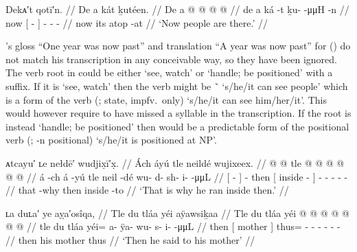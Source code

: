 \ex\label{ex:92-174-people-there}%
%
\begingl
	\glpreamble	Dekᴀ′t qotī′n. //
	\glpreamble	De a kát ḵutéen. //
	\gla	De {} a  @ {} {}  @ {} @ {} @ {} //
	\glb	de {} a ká -t {} ḵu-  -μμH -n //
	\glc	now {}[   - {}]
		-  - - //
	\gld	now {} its atop -at {}  {} {} {} //
	\glft	‘Now people are there.’
		//
\endgl
\xe

\citeauthor{swanton:1909}’s gloss “One year was now past” and translation “A year was now past” for (\lastx) do not match his transcription in any conceivable way, so they have been ignored.
The verb root in  could be either  ‘see, watch’ or  ‘handle; be positioned’ with a  suffix.
If it is  ‘see, watch’ then the verb might be  \~\  ‘s/he/it can see people’ which is a form of the verb  (;  state, impfv.\ only) ‘s/he/it can see him/her/it’.
This would however require \citeauthor{swanton:1909} to have missed a syllable in the transcription.
If the root is instead  ‘handle; be positioned’ then  would be a predictable form of the positional verb  (; -n positional) ‘s/he/it is positioned at NP’.

\ex\label{ex:92-175-thats-why-ran-inside}%
%
\begingl
	\glpreamble	ᴀtcayu′ ʟe nełdē′ wudjix̣ī′x̣. //
	\glpreamble	Ách áyú tle neildé wujixeex. //
	\gla	{}  @ {} {}  @ {}
		tle {}  @ {} {}  @ {} @ {} @ {} @ {} @ {} //
	\glb	{} á -ch {} á -yú
		tle {} neil -dé {} wu- d- sh- i-  -μμL //
	\glc	{}[  - {}]  -
		then {}[ inside - {}]
		- - - -  - //
	\gld	{} that -why {}  {}
		then {} inside -to {}  //
	\glft	‘That is why he ran inside then.’
		//
\endgl
\xe

\ex\label{ex:92-176-then-said-to-mother}%
%
\begingl
	\glpreamble	ʟa duʟa′ ye aỵa′osîqa, //
	\glpreamble	Tle du tláa yéi aÿawsiḵaa //
	\gla	Tle {} du tláa {}
		yéi @  @ {} @ {} @ {} @ {} @ {} @ {} //
	\glb	tle {} du tláa {}
		yéi= a- ÿa- wu- s- i-  -μμL //
	\glc	then {}[  mother {}]
		thus= - - - - -
			 - //
	\gld	then {} his mother {}
		thus  {} {} {} {} {} {} //
	\glft	‘Then he said to his mother’
		//
\endgl
\xe


